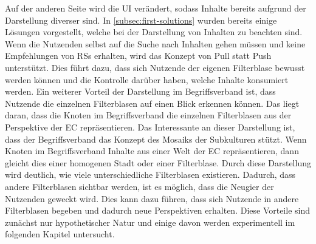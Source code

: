 Auf der anderen Seite wird die \ac{UI} verändert, sodass Inhalte bereits aufgrund der Darstellung diverser sind.
In \autoref{subsec:first-solutions} wurden bereits einige Lösungen vorgestellt, welche bei der Darstellung von Inhalten zu beachten sind.
Wenn die Nutzenden selbst auf die Suche nach Inhalten gehen müssen und keine Empfehlungen von \acp{RS} erhalten, wird das Konzept von Pull statt Push unterstützt.
Dies führt dazu, dass sich Nutzende der eigenen Filterblase bewusst werden können und die Kontrolle darüber haben, welche Inhalte konsumiert werden.
Ein weiterer Vorteil der Darstellung im Begriffsverband ist, dass Nutzende die einzelnen Filterblasen auf einen Blick erkennen können.
Das liegt daran, dass die Knoten im Begriffsverband die einzelnen Filterblasen aus der Perspektive der \ac{EC} repräsentieren.
Das Interessante an dieser Darstellung ist, dass der Begriffsverband das Konzept des Mosaiks der Subkulturen stützt.
Wenn Knoten im Begriffsverband Inhalte aus einer Welt der \ac{EC} repräsentieren, dann gleicht dies einer homogenen Stadt oder einer Filterblase.
Durch diese Darstellung wird deutlich, wie viele unterschiedliche Filterblasen existieren.
Dadurch, dass andere Filterblasen sichtbar werden, ist es möglich, dass die Neugier der Nutzenden geweckt wird.
Dies kann dazu führen, dass sich Nutzende in andere Filterblasen begeben und dadurch neue Perspektiven erhalten.
Diese Vorteile sind zunächst nur hypothetischer Natur und einige davon werden experimentell im folgenden Kapitel untersucht.
